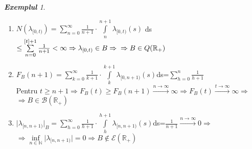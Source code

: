 \documentclass[ a4paper, 12pt]{report}
\theoremstyle{remark}
\newtheorem{exemple}{\bf Exemplul}[section]
\numberwithin{equation}{section}
\begin{document}
\begin{exemple}
\begin{enumerate}
\item $N(\lambda_{[0,t)})=\sum\limits_{n=0}^{\infty}\frac{1}{n+1}\cdot \int\limits_{n}^{n+1}\lambda_{[0,t)}(s)$ ds $\leq \sum\limits_{n=0}^{[t]+1}\frac{1}{n+1}<\infty\Rightarrow\lambda_{[0,t)}\in B \Rightarrow\\\Rightarrow B\in Q(\mathbb{R}_+)$
\item
$F_B(n+1)=\sum\limits_{k=0}^{\infty}\frac{1}{k+1}\cdot\int\limits_{k}^{k+1}\lambda_{[0,n+1)}(s)$ds=$\sum\limits_{h=0}^{n}\frac{1}{h+1}$\\
Pentru $t\geq n+1\Rightarrow F_B(t)\geq F_B(n+1)\xrightarrow{n\rightarrow\infty}\infty \Rightarrow F_B(t)\xrightarrow{t\xrightarrow{}\infty}\infty\Rightarrow$\\$\Rightarrow B\in\mathcal{B}(\mathbb{R}_+)$
\newpage
\item
$\lvert\lambda_{[n,n+1)}\rvert_B=\sum\limits_{h=0}^{\infty}\frac{1}{h+1}\cdot\int\limits_{h}^{h+1}\lambda_{[n,n+1)}(s)$ds=$\frac{1}{n+1}\xrightarrow{n\xrightarrow{}\infty}0\Rightarrow$\\$ \Rightarrow\inf\limits_{n \in \mathbb{N}} \lvert \lambda_{[n,n+1)} \rvert = 0 \Rightarrow B\notin\mathcal{E}(\mathbb{R}_+)$
\end{enumerate}
\end{exemple}
\end{document}
